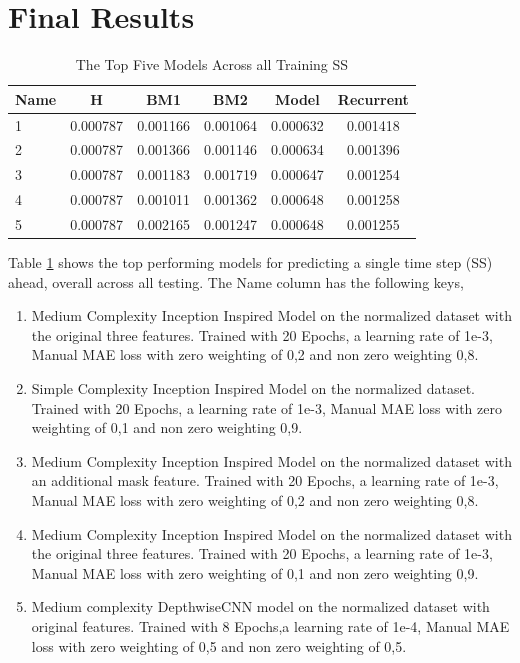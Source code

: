 \section{Final Results}
\begin{table}[htbp]
	\centering
	\caption{The Top Five Models Across all Training SS}
	\label{tab:best_ss}
	\begin{tabular}{p{2cm}ccccc}
		\toprule
		Name &  H &  BM1 &  BM2 &  Model &  Recurrent \\
		\midrule
		1 &       0.000787 &        0.001166 &        0.001064 &   0.000632 &            0.001418 \\
		2 &       0.000787 &        0.001366 &        0.001146 &   0.000634 &            0.001396 \\
		3 &       0.000787 &        0.001183 &        0.001719 &   0.000647 &            0.001254 \\
		4 &       0.000787 &        0.001011 &        0.001362 &   0.000648 &            0.001258 \\
		5 &       0.000787 &        0.002165 &        0.001247 &   0.000648 &            0.001255 \\
		\bottomrule
	\end{tabular}
\end{table}
Table \ref{tab:best_ss} shows the top performing models for predicting a single time step (SS) ahead, overall across all testing. The Name column has the following keys,
\begin{enumerate}
	\item Medium Complexity Inception Inspired Model on the normalized dataset with the original three features. Trained with 20 Epochs, a learning rate of 1e-3, Manual MAE loss with zero weighting of 0,2 and non zero weighting 0,8.
	\item Simple Complexity Inception Inspired Model on the normalized dataset. Trained with 20 Epochs, a learning rate of 1e-3, Manual MAE loss with zero weighting of 0,1 and non zero weighting 0,9.
	\item Medium Complexity Inception Inspired Model on the normalized dataset with an additional mask feature. Trained with 20 Epochs, a learning rate of 1e-3, Manual MAE loss with zero weighting of 0,2 and non zero weighting 0,8.
	\item Medium Complexity Inception Inspired Model on the normalized dataset with the original three features. Trained with 20 Epochs, a learning rate of 1e-3, Manual MAE loss with zero weighting of 0,1 and non zero weighting 0,9.
	\item Medium complexity DepthwiseCNN model on the normalized dataset with original features. Trained with 8 Epochs,a learning rate of 1e-4, Manual MAE loss with zero weighting of 0,5 and non zero weighting of 0,5.
\end{enumerate}

